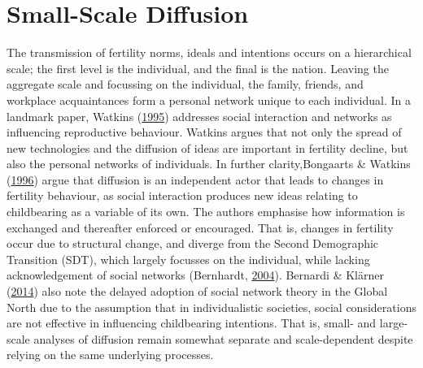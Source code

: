 \documentclass[12pt,twoside]{reedthesis}
\begin{document}
\hypertarget{small-scale-diffusion}{%
\section{Small-Scale Diffusion}\label{small-scale-diffusion}}

The transmission of fertility norms, ideals and intentions occurs on a hierarchical scale; the first level is the individual, and the final is the nation. Leaving the aggregate scale and focussing on the individual, the family, friends, and workplace acquaintances form a personal network unique to each individual. In a landmark paper, Watkins (\protect\hyperlink{ref-watkins1995}{1995}) addresses social interaction and networks as influencing reproductive behaviour. Watkins argues that not only the spread of new technologies and the diffusion of ideas are important in fertility decline, but also the personal networks of individuals. In further clarity,Bongaarts \& Watkins (\protect\hyperlink{ref-bongaarts1996}{1996}) argue that diffusion is an independent actor that leads to changes in fertility behaviour, as social interaction produces new ideas relating to childbearing as a variable of its own. The authors emphasise how information is exchanged and thereafter enforced or encouraged. That is, changes in fertility occur due to structural change, and diverge from the Second Demographic Transition (SDT), which largely focusses on the individual, while lacking acknowledgement of social networks (Bernhardt, \protect\hyperlink{ref-bernhardt2004}{2004}). Bernardi \& Klärner (\protect\hyperlink{ref-bernardi2014}{2014}) also note the delayed adoption of social network theory in the Global North due to the assumption that in individualistic societies, social considerations are not effective in influencing childbearing intentions. That is, small- and large-scale analyses of diffusion remain somewhat separate and scale-dependent despite relying on the same underlying processes.
\end{document}
